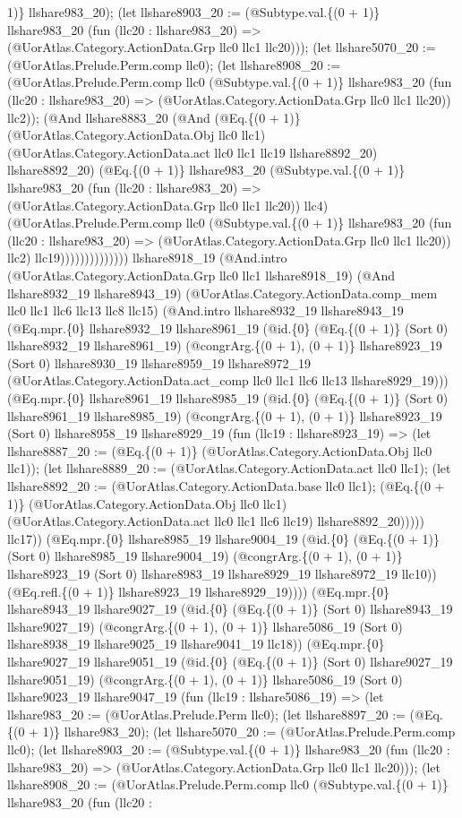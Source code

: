 \documentclass[11pt]{article}
\begin{document}
1)\} llshare983\_20); (let llshare8903\_20 := (@Subtype.val.\{(0 + 1)\} llshare983\_20 (fun (llc20 : llshare983\_20) => (@UorAtlas.Category.ActionData.Grp llc0 llc1 llc20))); (let llshare5070\_20 := (@UorAtlas.Prelude.Perm.comp llc0); (let llshare8908\_20 := (@UorAtlas.Prelude.Perm.comp llc0 (@Subtype.val.\{(0 + 1)\} llshare983\_20 (fun (llc20 : llshare983\_20) => (@UorAtlas.Category.ActionData.Grp llc0 llc1 llc20)) llc2)); (@And llshare8883\_20 (@And (@Eq.\{(0 + 1)\} (@UorAtlas.Category.ActionData.Obj llc0 llc1) (@UorAtlas.Category.ActionData.act llc0 llc1 llc19 llshare8892\_20) llshare8892\_20) (@Eq.\{(0 + 1)\} llshare983\_20 (@Subtype.val.\{(0 + 1)\} llshare983\_20 (fun (llc20 : llshare983\_20) => (@UorAtlas.Category.ActionData.Grp llc0 llc1 llc20)) llc4) (@UorAtlas.Prelude.Perm.comp llc0 (@Subtype.val.\{(0 + 1)\} llshare983\_20 (fun (llc20 : llshare983\_20) => (@UorAtlas.Category.ActionData.Grp llc0 llc1 llc20)) llc2) llc19)))))))))))))) llshare8918\_19 (@And.intro (@UorAtlas.Category.ActionData.Grp llc0 llc1 llshare8918\_19) (@And llshare8932\_19 llshare8943\_19) (@UorAtlas.Category.ActionData.comp\_mem llc0 llc1 llc6 llc13 llc8 llc15) (@And.intro llshare8932\_19 llshare8943\_19 (@Eq.mpr.\{0\} llshare8932\_19 llshare8961\_19 (@id.\{0\} (@Eq.\{(0 + 1)\} (Sort 0) llshare8932\_19 llshare8961\_19) (@congrArg.\{(0 + 1), (0 + 1)\} llshare8923\_19 (Sort 0) llshare8930\_19 llshare8959\_19 llshare8972\_19 (@UorAtlas.Category.ActionData.act\_comp llc0 llc1 llc6 llc13 llshare8929\_19))) (@Eq.mpr.\{0\} llshare8961\_19 llshare8985\_19 (@id.\{0\} (@Eq.\{(0 + 1)\} (Sort 0) llshare8961\_19 llshare8985\_19) (@congrArg.\{(0 + 1), (0 + 1)\} llshare8923\_19 (Sort 0) llshare8958\_19 llshare8929\_19 (fun (llc19 : llshare8923\_19) => (let llshare8887\_20 := (@Eq.\{(0 + 1)\} (@UorAtlas.Category.ActionData.Obj llc0 llc1)); (let llshare8889\_20 := (@UorAtlas.Category.ActionData.act llc0 llc1); (let llshare8892\_20 := (@UorAtlas.Category.ActionData.base llc0 llc1); (@Eq.\{(0 + 1)\} (@UorAtlas.Category.ActionData.Obj llc0 llc1) (@UorAtlas.Category.ActionData.act llc0 llc1 llc6 llc19) llshare8892\_20))))) llc17)) (@Eq.mpr.\{0\} llshare8985\_19 llshare9004\_19 (@id.\{0\} (@Eq.\{(0 + 1)\} (Sort 0) llshare8985\_19 llshare9004\_19) (@congrArg.\{(0 + 1), (0 + 1)\} llshare8923\_19 (Sort 0) llshare8983\_19 llshare8929\_19 llshare8972\_19 llc10)) (@Eq.refl.\{(0 + 1)\} llshare8923\_19 llshare8929\_19)))) (@Eq.mpr.\{0\} llshare8943\_19 llshare9027\_19 (@id.\{0\} (@Eq.\{(0 + 1)\} (Sort 0) llshare8943\_19 llshare9027\_19) (@congrArg.\{(0 + 1), (0 + 1)\} llshare5086\_19 (Sort 0) llshare8938\_19 llshare9025\_19 llshare9041\_19 llc18)) (@Eq.mpr.\{0\} llshare9027\_19 llshare9051\_19 (@id.\{0\} (@Eq.\{(0 + 1)\} (Sort 0) llshare9027\_19 llshare9051\_19) (@congrArg.\{(0 + 1), (0 + 1)\} llshare5086\_19 (Sort 0) llshare9023\_19 llshare9047\_19 (fun (llc19 : llshare5086\_19) => (let llshare983\_20 := (@UorAtlas.Prelude.Perm llc0); (let llshare8897\_20 := (@Eq.\{(0 + 1)\} llshare983\_20); (let llshare5070\_20 := (@UorAtlas.Prelude.Perm.comp llc0); (let llshare8903\_20 := (@Subtype.val.\{(0 + 1)\} llshare983\_20 (fun (llc20 : llshare983\_20) => (@UorAtlas.Category.ActionData.Grp llc0 llc1 llc20))); (let llshare8908\_20 := (@UorAtlas.Prelude.Perm.comp llc0 (@Subtype.val.\{(0 + 1)\} llshare983\_20 (fun (llc20 : 
\end{document}
